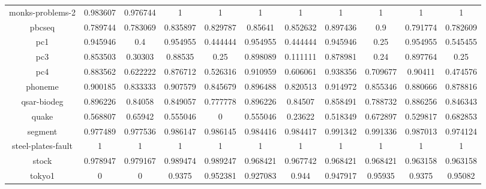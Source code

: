 \documentclass[review]{elsarticle}
\begin{document}
\begin{table}[htbp]
{\begin{tabular}{ccccccccccc}
		monks-problems-2                 & 0.983607             & 0.976744            & 1         & 1        & 1                 & 1                & 1          & 1         & 1         & 1         \\
		pbcseq                           & 0.789744             & 0.783069            & 0.835897  & 0.829787 & 0.85641           & 0.852632         & 0.897436   & 0.9       & 0.791774  & 0.782609  \\
		pc1                              & 0.945946             & 0.4                 & 0.954955  & 0.444444 & 0.954955          & 0.444444         & 0.945946   & 0.25      & 0.954955  & 0.545455  \\
		pc3                              & 0.853503             & 0.30303             & 0.88535   & 0.25     & 0.898089          & 0.111111         & 0.878981   & 0.24      & 0.897764  & 0.25      \\
		pc4                              & 0.883562             & 0.622222            & 0.876712  & 0.526316 & 0.910959          & 0.606061         & 0.938356   & 0.709677  & 0.90411   & 0.474576  \\
		phoneme                          & 0.900185             & 0.833333            & 0.907579  & 0.845679 & 0.896488          & 0.820513         & 0.914972   & 0.855346  & 0.880666  & 0.878816  \\
		qsar-biodeg                      & 0.896226             & 0.84058             & 0.849057  & 0.777778 & 0.896226          & 0.84507          & 0.858491   & 0.788732  & 0.886256  & 0.846343  \\
		quake                            & 0.568807             & 0.65942             & 0.555046  & 0        & 0.555046          & 0.23622          & 0.518349   & 0.672897  & 0.529817  & 0.682853  \\
		segment                          & 0.977489             & 0.977536            & 0.986147  & 0.986145 & 0.984416          & 0.984417         & 0.991342   & 0.991336  & 0.987013  & 0.974124  \\
		steel-plates-fault               & 1                    & 1                   & 1         & 1        & 1                 & 1                & 1          & 1         & 1         & 1         \\
		stock                            & 0.978947             & 0.979167            & 0.989474  & 0.989247 & 0.968421          & 0.967742         & 0.968421   & 0.968421  & 0.963158  & 0.963158  \\
		tokyo1                           & 0                    & 0                   & 0.9375    & 0.952381 & 0.927083          & 0.944            & 0.947917   & 0.95935   & 0.9375    & 0.95082   \\

\end{tabular}}
\end{table}
\end{document}
